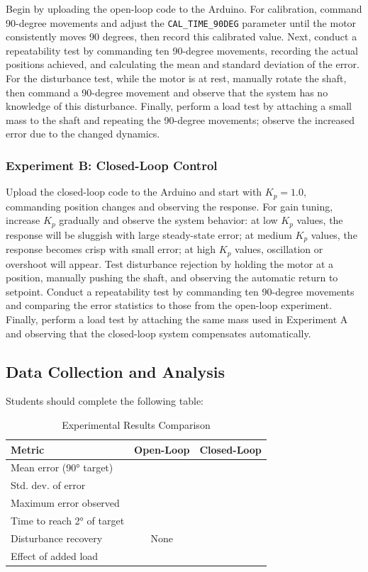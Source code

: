 Begin by uploading the open-loop code to the Arduino. For calibration, command 90-degree movements and adjust the \texttt{CAL\_TIME\_90DEG} parameter until the motor consistently moves 90 degrees, then record this calibrated value. Next, conduct a repeatability test by commanding ten 90-degree movements, recording the actual positions achieved, and calculating the mean and standard deviation of the error. For the disturbance test, while the motor is at rest, manually rotate the shaft, then command a 90-degree movement and observe that the system has no knowledge of this disturbance. Finally, perform a load test by attaching a small mass to the shaft and repeating the 90-degree movements; observe the increased error due to the changed dynamics.

\subsubsection{Experiment B: Closed-Loop Control}

Upload the closed-loop code to the Arduino and start with $K_p = 1.0$, commanding position changes and observing the response. For gain tuning, increase $K_p$ gradually and observe the system behavior: at low $K_p$ values, the response will be sluggish with large steady-state error; at medium $K_p$ values, the response becomes crisp with small error; at high $K_p$ values, oscillation or overshoot will appear. Test disturbance rejection by holding the motor at a position, manually pushing the shaft, and observing the automatic return to setpoint. Conduct a repeatability test by commanding ten 90-degree movements and comparing the error statistics to those from the open-loop experiment. Finally, perform a load test by attaching the same mass used in Experiment A and observing that the closed-loop system compensates automatically.

\subsection{Data Collection and Analysis}

Students should complete the following table:

\begin{table}[htbp]
\centering
\caption{Experimental Results Comparison}
\label{tab:results}
\begin{tabular}{lcc}
\toprule
\textbf{Metric} & \textbf{Open-Loop} & \textbf{Closed-Loop} \\
\midrule
Mean error (90° target) & & \\
Std. dev. of error & & \\
Maximum error observed & & \\
Time to reach 2° of target & & \\
Disturbance recovery & None & \\
Effect of added load & & \\
\bottomrule
\end{tabular}
\end{table}

